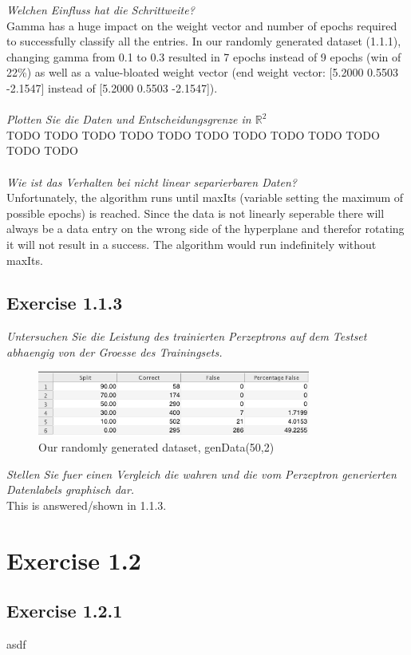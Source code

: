 \documentclass[10pt, journal,compsoc]{article}
\def\x#1#2{$\mathbb{#1}^#2$}
\def\n#1{\x#1}
\begin{document}
\textit{Welchen Einfluss hat die Schrittweite?}
\\
Gamma has a huge impact on the weight vector and number of epochs required to successfully classify all the entries. In our randomly generated dataset (1.1.1), changing gamma from 0.1 to 0.3 resulted in 7 epochs instead of 9 epochs (win of 22\%) as well as a value-bloated weight vector (end weight vector:  [5.2000 0.5503 -2.1547] instead of [5.2000 0.5503 -2.1547]).
\\
\\


\textit{Plotten Sie die Daten und Entscheidungsgrenze in \n{R2}}
\\
TODO TODO TODO TODO TODO TODO TODO TODO TODO TODO TODO TODO
\\
\\

\textit{Wie ist das Verhalten bei nicht linear separierbaren Daten?}
\\
Unfortunately, the algorithm runs until maxIts (variable setting the maximum of possible epochs) is reached. Since the data is not linearly seperable there will always be a data entry on the wrong side of the hyperplane and therefor rotating it will not result in a success. The algorithm would run indefinitely without maxIts. 

\subsection{Exercise 1.1.3}
\textit{Untersuchen Sie die Leistung des trainierten Perzeptrons auf dem Testset abhaengig von der Groesse des Trainingsets.}
\\
\begin{figure}[htp]
	\centering
	\includegraphics[width=0.8\textwidth]{ab1_1_3}
	\caption{Our randomly generated dataset, genData(50,2)}\label{fig:1}
\end{figure}

\textit{Stellen Sie fuer einen Vergleich die wahren und die vom Perzeptron generierten Datenlabels graphisch dar.}
\\
This is answered/shown in 1.1.3.

\section{Exercise 1.2}
\subsection{Exercise 1.2.1}
asdf
\end{document}
